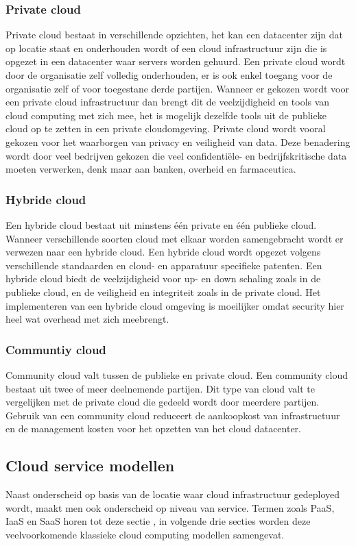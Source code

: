 \subsubsection{Private cloud}
Private cloud bestaat in verschillende opzichten, het kan een datacenter zijn dat op locatie staat en onderhouden wordt of een cloud infrastructuur zijn die is opgezet in een datacenter waar servers worden gehuurd. Een private cloud wordt door de organisatie zelf volledig onderhouden, er is ook enkel toegang voor de organisatie zelf of voor toegestane derde partijen. Wanneer er gekozen wordt voor een private cloud infrastructuur dan brengt dit de veelzijdigheid en tools van cloud computing met zich mee, het is mogelijk dezelfde tools uit de publieke cloud op te zetten in een private cloudomgeving. Private cloud wordt vooral gekozen voor het waarborgen van privacy en veiligheid van data. Deze benadering wordt door veel bedrijven gekozen die veel confidentiële- en bedrijfskritische data moeten verwerken, denk maar aan banken, overheid en farmaceutica.

\subsubsection{Hybride cloud}
Een hybride cloud bestaat uit minstens één private en één publieke cloud. Wanneer verschillende soorten cloud met elkaar worden samengebracht wordt er verwezen naar een hybride cloud. Een hybride cloud wordt opgezet volgens verschillende standaarden en cloud- en apparatuur specifieke patenten. Een hybride cloud biedt de veelzijdigheid voor up- en down schaling zoals in de publieke cloud, en de veiligheid en integriteit zoals in de private cloud. Het implementeren van een hybride cloud omgeving is moeilijker omdat security hier heel wat overhead met zich meebrengt.

\subsubsection{Communtiy cloud}
Community cloud valt tussen de publieke en private cloud. Een community cloud bestaat uit twee of meer deelnemende partijen. Dit type van cloud valt te vergelijken met de private cloud die gedeeld wordt door meerdere partijen. Gebruik van een community cloud reduceert de aankoopkost van infrastructuur en de management kosten voor het opzetten van het cloud datacenter.


\subsection{Cloud service modellen}
\label{cloud-service-level}
Naast onderscheid op basis van de locatie waar cloud infrastructuur gedeployed wordt, maakt men ook onderscheid op niveau van service. Termen zoals PaaS, IaaS en SaaS horen tot deze sectie \autocite{Goyal2014}, in volgende drie secties worden deze veelvoorkomende klassieke cloud computing modellen samengevat.

